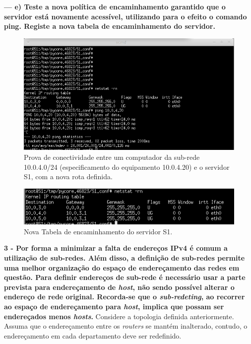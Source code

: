 \documentclass[a4paper]{article}
\begin{document}
\textbf{--- e) Teste a nova política de encaminhamento garantido que o servidor está novamente acessível, utilizando para o efeito o comando \textbf{ping}. Registe a nova tabela de encaminhamento do servidor.}\newline
\begin{figure}[!htb]
    \centering
    \includegraphics[scale=0.7]{parte2/nova-tabela-de-encaminhamento.png}\newline
    \caption{Prova de conectividade entre um computador da sub-rede 10.0.4.0/24 (especificamento do equipamento 10.0.4.20) e o servidor S1, com a nova rota definida.}
    \label{fig:my_label}
\end{figure}
\begin{figure}[!htb]
    \centering
    \includegraphics[scale=1]{parte2/nova-tabela.png}\newline
    \caption{Nova Tabela de encaminhamento do servidor S1.}
    \label{fig:my_label}
\end{figure}

\newpage

\textbf{3 - Por forma a minimizar a falta de endereços IPv4 é comum a utilização de sub-redes. Além disso, a definição de sub-redes permite uma melhor organização do espaço de endereçamento das redes em questão.\newline
Para definir endereços de sub-rede é necessário usar a parte prevista para endereçamento de \textit{host}, não sendo possível alterar o endereço de rede original. Recorda-se que o \textit{sub-redeting}, ao recorrer ao espaço de endereçamento para \textit{host}, implica que possam ser endereçados menos \textit{hosts}.}\newline
Considere a topologia definida anteriormente. Assuma que o endereçamento entre os \textit{routers} se mantém inalterado, contudo, o endereçamento em cada departamento deve ser redefinido.
\end{document}
